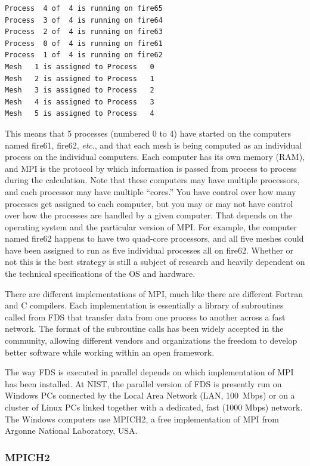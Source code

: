 \documentclass[11pt]{book}
\begin{document}
\footnotesize
\begin{verbatim}
Process  4 of  4 is running on fire65
Process  3 of  4 is running on fire64
Process  2 of  4 is running on fire63
Process  0 of  4 is running on fire61
Process  1 of  4 is running on fire62
Mesh   1 is assigned to Process   0
Mesh   2 is assigned to Process   1
Mesh   3 is assigned to Process   2
Mesh   4 is assigned to Process   3
Mesh   5 is assigned to Process   4
\end{verbatim} \normalsize
This means that 5 processes (numbered 0 to 4) have started on the computers named fire61, fire62, {\em etc}., and that each mesh is being computed as an individual process on the
individual computers. Each computer has its own memory (RAM), and MPI is the protocol by which information is passed from process to process during the calculation. Note that these
computers may have multiple processors, and each processor may have multiple ``cores.'' You have control over how many processes get assigned to each computer, but you may or may not
have control over how the processes are handled by a given computer. That depends on the operating system and the particular version of MPI. For example, the computer named fire62 happens to have
two quad-core processors, and all five meshes could have been assigned to run as five individual processes all on fire62. Whether or not this is the best strategy is still a subject of
research and heavily dependent on the technical specifications of the OS and hardware.


There are different implementations of MPI, much like there
are different Fortran and C compilers. Each implementation is
essentially a library of subroutines called from FDS that transfer
data from one process to another across a fast network. The format of
the subroutine calls has been widely accepted in the community,
allowing different vendors and organizations the freedom to develop
better software while working within an open framework.

The way FDS is executed in parallel depends on which implementation of
MPI has been installed.  At NIST, the parallel version of FDS is
presently run on Windows PCs connected by the Local Area Network (LAN,
100~Mbps) or on a cluster of Linux PCs linked together with a
dedicated, fast (1000 Mbps) network.  The Windows computers use
MPICH2, a free implementation of MPI from Argonne National Laboratory,
USA.

\subsubsection{MPICH2}
\end{document}
